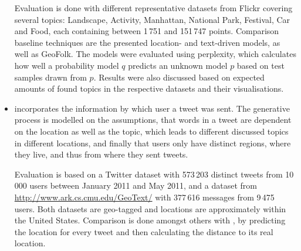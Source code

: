 \begin{itemize}

Evaluation is done with different representative datasets from Flickr covering several topics: Landscape, Activity, Manhattan, National Park, Festival, Car and Food, each containing between 1\,751 and 151\,747 points. Comparison baseline techniques are the presented location- and text-driven models, as well as GeoFolk\cite{Sizov2010}. The models were evaluated using perplexity, which calculates how well a probability model $q$ predicts an unknown model $p$ based on test samples drawn from $p$. Results were also discussed based on expected amounts of found topics in the respective datasets and their visualisations.

\item \textcite{Hong2012} incorporates the information by which user a tweet was sent. The generative process is modelled on the assumptions, that words in a tweet are dependent on the location as well as the topic, which leads to different discussed topics in different locations, and finally that users only have distinct regions, where they live, and thus from where they sent tweets.




Evaluation is based on a Twitter dataset with 573\,203 distinct tweets from 10\,000 users between January 2011 and May 2011, and a dataset from \url{http://www.ark.cs.cmu.edu/GeoText/} with 377\,616 messages from 9\,475 users. Both datasets are geo-tagged and locations are approximately within the United States. Comparison is done amongst others with \cite{Yin2011}, by predicting the location for every tweet and then calculating the distance to its real location.

\end{itemize}
